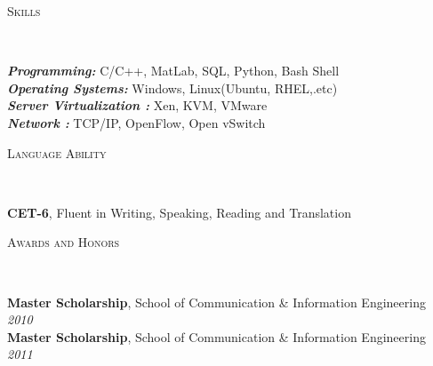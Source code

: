 \documentclass[9pt]{article}
\newenvironment{changemargin}[2]{%
  \begin{list}{}{%
    \setlength{\topsep}{0pt}%
    \setlength{\leftmargin}{#1}%
    \setlength{\rightmargin}{#2}%
    \setlength{\listparindent}{\parindent}%
    \setlength{\itemindent}{\parindent}%
    \setlength{\parsep}{\parskip}%
  }%
  \item[]}{\end{list}
}
\newcommand{\lineover}{
	\begin{changemargin}{-0.05in}{-0.05in}
		\vspace*{-8pt}
		\hrulefill \\
		\vspace*{-2pt}
	\end{changemargin}
}
\newcommand{\header}[1]{
	\begin{changemargin}{-0.5in}{-0.5in}
		\scshape{#1}\\
  	\lineover
	\end{changemargin}
}
\newenvironment{body} {
	\vspace*{-16pt}
	\begin{changemargin}{-0.25in}{-0.5in}
  }	
	{\end{changemargin}
}
\begin{document}
\smallskip







\header{Skills}

\begin{body}
	\vspace{14pt}
	\emph{\textbf{Programming:}}{} C/C++, MatLab, SQL, Python, Bash Shell  \\
	\emph{\textbf{Operating Systems:}}{} Windows, Linux(Ubuntu, RHEL,.etc)\\
    \emph{\textbf{Server Virtualization :}}{} Xen, KVM, VMware\\
    \emph{\textbf{Network :}}{} TCP/IP, OpenFlow, Open vSwitch\\
\end{body}

\smallskip


\header{Language Ability}

\begin{body}
	\vspace{14pt}
	\textbf{CET-6}, Fluent in Writing, Speaking, Reading and Translation
	\smallskip
	
\end{body}




\header{Awards and Honors}

\begin{body}
	\vspace{14pt}
	\textbf{Master Scholarship}, School of Communication \& Information Engineering  \hfill {} \emph{2010}\\
	\smallskip
	\textbf{Master Scholarship}, School of Communication \& Information Engineering  \hfill {} \emph{2011}\\
\smallskip
\end{body}
\end{document}
